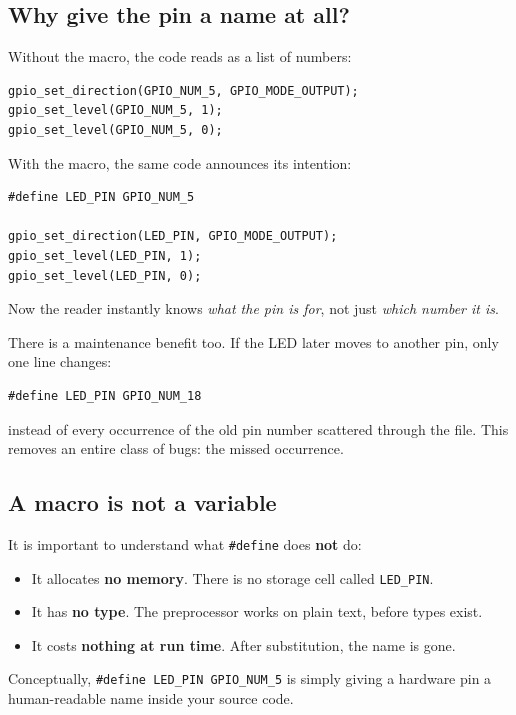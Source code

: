 \documentclass[11pt]{article}
\begin{document}
\subsection{Why give the pin a name at all?}

Without the macro, the code reads as a list of numbers:

\begin{verbatim}
gpio_set_direction(GPIO_NUM_5, GPIO_MODE_OUTPUT);
gpio_set_level(GPIO_NUM_5, 1);
gpio_set_level(GPIO_NUM_5, 0);
\end{verbatim}

With the macro, the same code announces its intention:

\begin{verbatim}
#define LED_PIN GPIO_NUM_5

gpio_set_direction(LED_PIN, GPIO_MODE_OUTPUT);
gpio_set_level(LED_PIN, 1);
gpio_set_level(LED_PIN, 0);
\end{verbatim}

Now the reader instantly knows \emph{what the pin is for}, not just \emph{which number it is}.

There is a maintenance benefit too. If the LED later moves to another pin, only one line changes:

\begin{verbatim}
#define LED_PIN GPIO_NUM_18
\end{verbatim}

instead of every occurrence of the old pin number scattered through the file. This removes an entire class of bugs: the missed occurrence.

\subsection{A macro is not a variable}

It is important to understand what \texttt{\#define} does \textbf{not} do:

\begin{itemize}
    \item It allocates \textbf{no memory}. There is no storage cell called \texttt{LED\_PIN}.
    \item It has \textbf{no type}. The preprocessor works on plain text, before types exist.
    \item It costs \textbf{nothing at run time}. After substitution, the name is gone.
\end{itemize}

Conceptually, \texttt{\#define LED\_PIN GPIO\_NUM\_5} is simply giving a hardware pin a human-readable name inside your source code.
\end{document}
